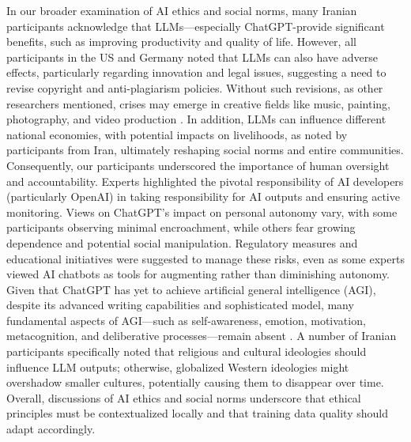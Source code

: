 \documentclass[sigconf]{acmart}
\begin{document}
In our broader examination of AI ethics and social norms, many Iranian participants acknowledge that LLMs—especially ChatGPT-provide significant benefits, such as improving productivity and quality of life. However, all participants in the US and Germany noted that LLMs can also have adverse effects, particularly regarding innovation and legal issues, suggesting a need to revise copyright and anti-plagiarism policies. Without such revisions, as other researchers mentioned, crises may emerge in creative fields like music, painting, photography, and video production \cite{samuelson2023generative, sag2023copyright}. In addition, LLMs can influence different national economies, with potential impacts on livelihoods, as noted by participants from Iran, ultimately reshaping social norms and entire communities. Consequently, our participants underscored the importance of human oversight and accountability. Experts highlighted the pivotal responsibility of AI developers (particularly OpenAI) in taking responsibility for AI outputs and ensuring active monitoring. Views on ChatGPT’s impact on personal autonomy vary, with some participants observing minimal encroachment, while others fear growing dependence and potential social manipulation. Regulatory measures and educational initiatives were suggested to manage these risks, even as some experts viewed AI chatbots as tools for augmenting rather than diminishing autonomy. Given that ChatGPT has yet to achieve artificial general intelligence (AGI), despite its advanced writing capabilities and sophisticated model, many fundamental aspects of AGI—such as self-awareness, emotion, motivation, metacognition, and deliberative processes—remain absent \cite{goertzel2014artificial}. A number of Iranian participants specifically noted that religious and cultural ideologies should influence LLM outputs; otherwise, globalized Western ideologies might overshadow smaller cultures, potentially causing them to disappear over time. Overall, discussions of AI ethics and social norms underscore that ethical principles must be contextualized locally and that training data quality should adapt accordingly.
\end{document}
